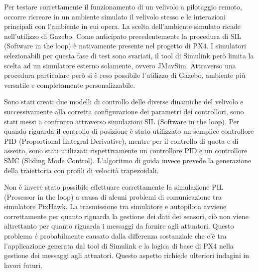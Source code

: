 Per testare correttamente il funzionamento di un velivolo a pilotaggio remoto, occorre ricreare in un ambiente simulato il velivolo stesso e le interazioni principali con l'ambiente in cui opera. La scelta dell'ambiente simulato ricade nell'utilizzo di Gazebo. Come anticipato precedentemente la procedura di SIL (Software in the loop) è nativamente presente nel progetto di PX4. I simulatori selezionabili per questa fase di test sono svariati, il tool di Simulink però limita la scelta ad un simulatore esterno solamente, ovvero JMavSim. Attraverso una procedura particolare però si è reso possibile l'utilizzo di Gazebo, ambiente più versatile e completamente personalizzabile.

Sono stati creati due modelli di controllo delle diverse dinamiche del velivolo e successivamente alla corretta configurazione dei parametri dei controllori, sono stati messi a confronto attraverso simulazioni SIL (Software in the loop). Per quando riguarda il controllo di posizione è stato utilizzato un semplice controllore PID (Proportional Iintegral Derivative), mentre per il controllo di quota e di assetto, sono stati utilizzati rispettivamente un controllore PID e un controllore SMC (Sliding Mode Control). L'algoritmo di guida invece prevede la generazione della traiettoria con profili di velocità trapezoidali.

Non è invece stato possibile effettuare correttamente la simulazione PIL (Prosessor in the loop) a causa di alcuni problemi di comunicazione tra simulatore PixHawk. La trasmissione tra simulatore e autopilota avviene correttamente per quanto riguarda la gestione dei dati dei sensori, ciò non viene altrettanto per quanto riguarda i messaggi da fornire agli attuatori. Questo problema é probabilmente causato dalla differenza sostanziale che c'è tra l'applicazione generata dal tool di Simulink e la logica di base di PX4 nella gestione dei messaggi agli attuatori. Questo aspetto richiede ulteriori indagini in lavori futuri.

